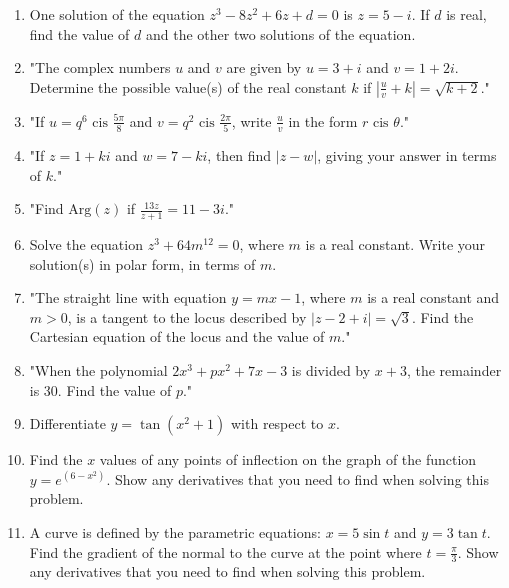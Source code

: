 \documentclass{article}
\begin{document}
\begin{enumerate}
\vspace{3cm}
\item One solution of the equation \( z^3 - 8z^2 + 6z + d = 0 \) is \( z = 5 - i \). If \( d \) is real, find the value of \( d \) and the other two solutions of the equation.
\vspace{3cm}
\item "The complex numbers \( u \) and \( v \) are given by \( u = 3 + i \) and \( v = 1 + 2i \). Determine the possible value(s) of the real constant \( k \) if \(\left| \frac{u}{v} + k \right| = \sqrt{k + 2}\)."
\vspace{3cm}
\item "If \( u = q^6 \text{ cis } \frac{5\pi}{8} \) and \( v = q^2 \text{ cis } \frac{2\pi}{5} \), write \( \frac{u}{v} \) in the form \( r \text{ cis } \theta \)."
\vspace{3cm}
\item "If \( z = 1 + ki \) and \( w = 7 - ki \), then find \( |z - w| \), giving your answer in terms of \( k \)."
\vspace{3cm}
\item "Find \( \text{Arg}(z) \) if \( \frac{13z}{z+1} = 11 - 3i \)."
\vspace{3cm}
\item Solve the equation \( z^3 + 64m^{12} = 0 \), where \( m \) is a real constant. Write your solution(s) in polar form, in terms of \( m \).
\vspace{3cm}
\item "The straight line with equation \( y = mx - 1 \), where \( m \) is a real constant and \( m > 0 \), is a tangent to the locus described by \( |z - 2 + i| = \sqrt{3} \). Find the Cartesian equation of the locus and the value of \( m \)."
\vspace{3cm}
\item "When the polynomial \(2x^3 + px^2 + 7x - 3\) is divided by \(x + 3\), the remainder is 30. Find the value of \(p\)."
\vspace{3cm}
\item Differentiate \( y = \tan(x^2 + 1) \) with respect to \( x \).
\vspace{3cm}
\item Find the \( x \) values of any points of inflection on the graph of the function \( y = e^{(6 - x^2)} \). Show any derivatives that you need to find when solving this problem.
\vspace{3cm}
\item A curve is defined by the parametric equations: \( x = 5 \sin t \) and \( y = 3 \tan t \). Find the gradient of the normal to the curve at the point where \( t = \frac{\pi}{3} \). Show any derivatives that you need to find when solving this problem.

\end{enumerate}
\end{document}
